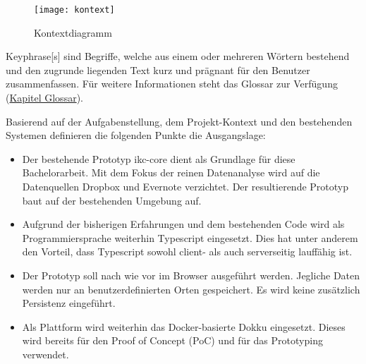 \begin{figure}[H]
\centering
\texttt{[image: kontext]}
\caption{Kontextdiagramm}
\label{fig:kontextdiagramm}
\end{figure}

\gls{Keyphrase}[s] sind Begriffe, welche aus einem oder mehreren Wörtern bestehend und den zugrunde liegenden Text kurz und prägnant für den Benutzer zusammenfassen. Für weitere Informationen steht das Glossar zur Verfügung (\hyperref[glossar]{Kapitel Glossar}).

Basierend auf der Aufgabenstellung, dem Projekt-Kontext und den bestehenden Systemen definieren die folgenden Punkte die Ausgangslage:
\begin{itemize}
    \item Der bestehende Prototyp \gls{ikc-core} dient als Grundlage für diese Bachelorarbeit. Mit dem Fokus der reinen Datenanalyse wird auf die Datenquellen Dropbox und Evernote verzichtet. Der resultierende Prototyp baut auf der bestehenden Umgebung auf.
    \item Aufgrund der bisherigen Erfahrungen und dem bestehenden Code wird als Programmiersprache weiterhin \gls{Typescript} eingesetzt. Dies hat unter anderem den Vorteil, dass \gls{Typescript} sowohl client- als auch serverseitig lauffähig ist.
    \item Der Prototyp soll nach wie vor im Browser ausgeführt werden. Jegliche Daten werden nur an benutzerdefinierten Orten gespeichert. Es wird keine zusätzlich Persistenz eingeführt.
    \item Als Plattform wird weiterhin das Docker-basierte \gls{Dokku} eingesetzt. Dieses wird bereits für den Proof of Concept (\gls{PoC}) und für das Prototyping verwendet.
\end{itemize}

